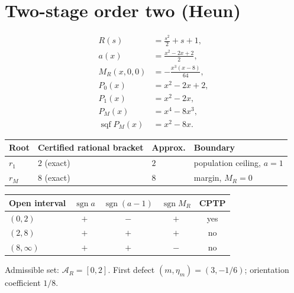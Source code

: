 \documentclass[11pt]{article}
\begin{document}
\section{Two-stage order two (Heun)}
\begin{align*}
R(s)&=\frac{s^{2}}{2} + s + 1,\\
a(x)&=\frac{x^{2} - 2 x + 2}{2},\\
M_R(x,0,0)&=- \frac{x^{3} \left(x - 8\right)}{64},\\
P_0(x)&=x^{2}-2 x+2,\\
P_1(x)&=x^{2}-2 x,\\
P_M(x)&=x^{4}-8 x^{3},\\
\operatorname{sqf}P_M(x)&=x^{2}-8 x.
\end{align*}
\begin{center}
\begin{tabular}{@{}llll@{}}
\toprule
Root & Certified rational bracket & Approx. & Boundary \\
\midrule
$r_1$ & $2$ (exact) & $2$ & population ceiling, $a=1$ \\
$r_M$ & $8$ (exact) & $8$ & margin, $M_R=0$ \\
\bottomrule
\end{tabular}
\end{center}
\begin{center}
\begin{tabular}{@{}lcccc@{}}
\toprule
Open interval & $\operatorname{sgn}a$ & $\operatorname{sgn}(a-1)$ & $\operatorname{sgn}M_R$ & CPTP \\
\midrule
$(0,2)$ & $+$ & $-$ & $+$ & yes \\
$(2,8)$ & $+$ & $+$ & $+$ & no \\
$(8,\infty)$ & $+$ & $+$ & $-$ & no \\
\bottomrule
\end{tabular}
\end{center}
Admissible set: $\mathcal A_R=[0,2]$. First defect $(m,\eta_m)=(3,-1/6)$; orientation coefficient $1/8$.
\end{document}
